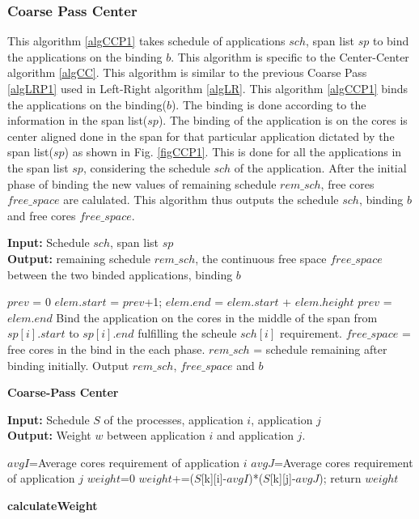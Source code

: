 \documentclass[10pt, conference]{IEEEtran}
\begin{document}
\subsubsection{Coarse Pass Center}
This algorithm \ref{algCCP1} takes schedule of applications $sch$, span list $sp$ to bind the applications on the binding $b$. This algorithm is specific to the Center-Center algorithm \ref{algCC}. This algorithm is similar to the previous Coarse Pass \ref{algLRP1} used in Left-Right algorithm \ref{algLR}. This algorithm \ref{algCCP1} binds the applications on the binding($b$). The binding is done according to the information in the span list($sp$). The binding of the application is on the cores is center aligned done in the span for that particular application dictated by the span list($sp$) as shown in Fig. \ref{figCCP1}. This is done for all the applications in the span list $sp$, considering the schedule $sch$ of the application. After the initial phase of binding the new values of remaining schedule $rem\_sch$, free cores $free\_space$ are calulated. This algorithm thus outputs the schedule $sch$, binding $b$ and free cores $free\_space$.
\begin{algorithm}[tb]
\footnotesize
\textbf{Input:} Schedule $sch$, span list $sp$ \ \\
\textbf{Output:} remaining schedule $rem\_sch$, the continuous free space $free\_space$ between the two binded applications, binding $b$
\begin{algorithmic}[1]
\STATE  $prev$ = 0
\STATE $elem.start$ = $prev$+1; $elem.end$ = $elem.start$ + $elem.height$
\STATE $prev$ = $elem.end$
\ENDFOR    
{} 
\STATE Bind the application on the cores in the middle of the span from $sp[i].start$ to $sp[i].end$ fulfilling the scheule $sch[i]$ requirement.
\STATE $free\_space$ = free cores in the bind in the each phase.   
\STATE $rem\_sch$ = schedule remaining after binding initially.
\ENDFOR
\STATE Output $rem\_sch$, $free\_space$ and $b$
\end{algorithmic}
\caption{\textbf{Coarse-Pass Center }}
\vspace{-0.1cm}
\label{algCCP1}
\end{algorithm}

\begin{algorithm}[tb]
\footnotesize
\textbf{Input:} Schedule $S$ of the processes, application $i$, application $j$  \ \\
\textbf{Output:} Weight $w$ between application $i$ and application $j$.
\begin{algorithmic}[1]
\STATE $avgI$=Average cores requirement of application $i$
\STATE $avgJ$=Average cores requirement of application $j$
\STATE $weight$=0
\STATE $weight$+=($S$[k][i]-$avgI$)*($S$[k][j]-$avgJ$);
\ENDFOR
\STATE return $weight$
\end{algorithmic}
\caption{\textbf{calculateWeight}}
\vspace{-0.1cm}
\label{algWeightCalculation}
\end{algorithm}
\end{document}
